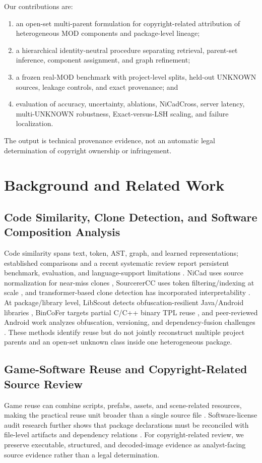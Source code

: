 \documentclass[runningheads]{llncs}
\begin{document}
Our contributions are:
\begin{enumerate}
    \item an open-set multi-parent formulation for copyright-related attribution of heterogeneous MOD components and package-level lineage;
    \item a hierarchical identity-neutral procedure separating retrieval, parent-set inference, component assignment, and graph refinement;
    \item a frozen real-MOD benchmark with project-level splits, held-out UNKNOWN sources, leakage controls, and exact provenance; and
    \item evaluation of accuracy, uncertainty, ablations, NiCadCross, server latency, multi-UNKNOWN robustness, Exact-versus-LSH scaling, and failure localization.
\end{enumerate}
The output is technical provenance evidence, not an automatic legal determination of copyright ownership or infringement.

\section{Background and Related Work}

\subsection{Code Similarity, Clone Detection, and Software Composition Analysis}
Code similarity spans text, token, AST, graph, and learned representations; established comparisons and a recent systematic review report persistent benchmark, evaluation, and language-support limitations \cite{roy2009comparison,zakeri2023slr}. NiCad uses source normalization for near-miss clones \cite{roy2008nicad}, SourcererCC uses token filtering/indexing at scale \cite{sajnani2016sourcerer}, and transformer-based clone detection has incorporated interpretability \cite{clonexformer2025}. At package/library level, LibScout detects obfuscation-resilient Java/Android libraries \cite{backes2016libscout}, BinCoFer targets partial C/C++ binary TPL reuse \cite{bincofer2025}, and peer-reviewed Android work analyzes obfuscation, versioning, and dependency-fusion challenges \cite{androidtpl2025,libmd2025}. These methods identify reuse but do not jointly reconstruct multiple project parents and an open-set unknown class inside one heterogeneous package.

\subsection{Game-Software Reuse and Copyright-Related Source Review}
Game reuse can combine scripts, prefabs, assets, and scene-related resources, making the practical reuse unit broader than a single source file \cite{trasobares2025reuse}. Software-license audit research further shows that package declarations must be reconciled with file-level artifacts and dependency relations \cite{german2010licensing}. For copyright-related review, we preserve executable, structured, and decoded-image evidence as analyst-facing source evidence rather than a legal determination.
\end{document}
